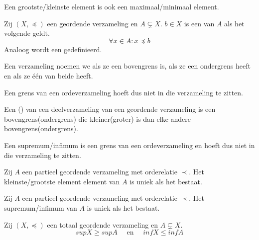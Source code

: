 \documentclass[main.tex]{subfiles}
\begin{document}
\begin{st}
  Een grootste/kleinste element is ook een maximaal/minimaal element.
\end{st}

\begin{de}
  Zij $(X,\preceq)$ een geordende verzameling en $A \subsetneq X$.
  $b \in X$ is een  van $A$ als het volgende geldt.
  \[ \forall x \in A: x \preceq b \]
  Analoog wordt een  gedefinieerd.
\end{de}

\begin{de}
  Een verzameling noemen we  als ze een bovengrens is,  als ze een ondergrens heeft en  als ze \'e\'en van beide heeft.
\end{de}

\begin{opm}
  Een grens van een ordeverzameling hoeft dus niet in die verzameling te zitten.
\end{opm}

\begin{de}
  Een () van een deelverzameling van een geordende verzameling is een bovengrens(ondergrens) die kleiner(groter) is dan elke andere bovengrens(ondergrens).
\end{de}

\begin{opm}
  Een supremum/infimum is een grens van een ordeverzameling en hoeft dus niet in die verzameling te zitten.
\end{opm}

\begin{st}
  Zij $A$ een partieel geordende verzameling met orderelatie $\prec$.
  Het kleinste/grootste element element van $A$ is uniek als het bestaat.
\end{st}

\begin{st}
  Zij $A$ een partieel geordende verzameling met orderelatie $\prec$.
  Het supremum/infimum van $A$ is uniek als het bestaat.
\end{st}

\begin{st}
  \label{st:deelverzameling-kleiner-supremum}
  Zij $(X,\preceq)$ een totaal geordende verzameling en $A \subsetneq X$.
  \[ sup X \ge sup A \quad\text{ en }\quad inf X \le inf A \]
\end{st}
\end{document}
